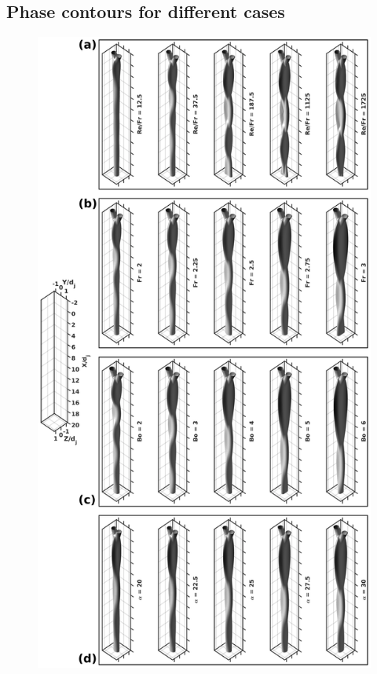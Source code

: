\documentclass[%
aip,
sd,%
amsmath,amssymb,
preprint,%
author-year,%
]{revtex4-1}
\begin{document}
\subsection{Phase contours for different cases}
\lipsum[1]
\begin{figure}
	\centering
	\includegraphics[width=\linewidth]{phaseContours}
	\caption{}
	\label{Figure::phaseContours}
\end{figure}
\lipsum[1]
\end{document}
